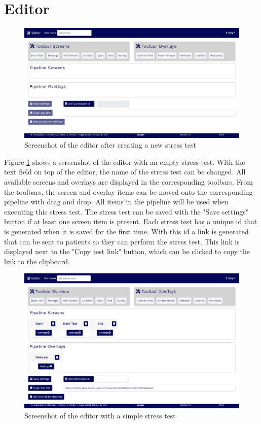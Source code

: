 \section{Editor}
\label{sec:editor}

\begin{figure}[htb]
    \centering
    \includegraphics[width=\textwidth]{figures/screenshot-editor.png}
    \caption{Screenshot of the editor after creating a new stress test}
    \label{fig:screenshot-editor}
\end{figure}

Figure \ref{fig:screenshot-editor} shows a screenshot of the editor with an empty stress test.
With the text field on top of the editor, the name of the stress test can be changed.
All available screens and overlays are displayed in the corresponding toolbars.
From the toolbars, the screen and overlay items can be moved onto the corresponding pipeline with drag and drop.
All items in the pipeline will be used when executing this stress test.
The stress test can be saved with the "Save settings" button if at least one screen item is present.
Each stress test has a unique id that is generated when it is saved for the first time.
With this id a link is generated that can be sent to patients so they can perform the stress test.
This link is displayed next to the "Copy test link" button, which can be clicked to copy the link to the clipboard.

\begin{figure}[htb]
    \centering
    \includegraphics[width=\textwidth]{figures/screenshot-editor-with-items.png}
    \caption{Screenshot of the editor with a simple stress test}
    \label{fig:screenshot-editor-with-items}
\end{figure}

